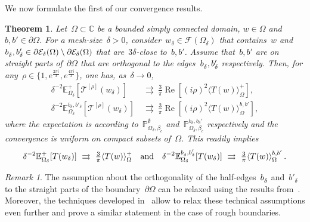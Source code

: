 \documentclass[reqno,11pt,a4paper]{amsart}
\newtheorem{theorem}{Theorem}
\theoremstyle{remark}
\newtheorem{remark}[proposition]{Remark}
\newcommand{\calE}{\mathcal{E}}
\newcommand{\bbP}{\mathbb{P}}
\newcommand{\Edges}{\mathcal{E}}
\newcommand{\Faces}{\mathcal{F}}
\newcommand{\C}{\mathbb{C}}
\newcommand{\dob}{{b,b'}}
\newcommand{\Edelta}{\mathbb{E}_{\Omega_\delta}}
\renewcommand\Re{\operatorname{Re}}
\newcommand\Corr[1]{\langle #1 \rangle}
\newcommand\CorrO[2][+]{\Corr{#2}_\Omega^{#1}}
\begin{document}
We now formulate the first of our convergence results.

\begin{theorem} \label{thm:Ising1}
	Let~$\Omega\subset\C$ be a bounded simply connected domain, $w\in\Omega$ and~$b,b'\in\partial\Omega$.
	For a mesh-size~$\delta>0$, consider~$w_\delta\in\Faces(\Omega_\delta)$ that contains~$w$ and~$b^{\vphantom{\prime}}_\delta,b'_\delta \in\partial\Edges_\delta(\Omega)\setminus \partial\calE_\delta(\Omega)$ that are~$3\delta$-close to~$b,b'$.
	Assume that~$b,b'$ are on straight parts of~$\partial \Omega$ that are orthogonal to the edges~$b^{\vphantom{\prime}}_\delta,b'_\delta$ respectively.
	Then, for any~$\rho\in\{1, e^{\frac{2\pi i}{3} },e^{\frac{4\pi i}{3}}\}$, one has, as~$\delta\to 0$,
\begin{align*}
	\delta^{-2}\Edelta^+[\mathcal{T}^{[\rho]}(w_\delta)]&~\rightrightarrows~\tfrac{3}{\pi}\Re[(i\rho)^2\CorrO{T(w)}], \\
	\delta^{-2}\Edelta^{b_\delta,b'_\delta}[\mathcal{T}^{[\rho]}(w_\delta)]&~\rightrightarrows~\tfrac{3}{\pi}\Re[(i\rho)^2\Corr{T(w)}_\Omega^{b,b'}],
\end{align*}
where the expectation is according to~$\bbP_{\Omega_{\delta},\beta_c}^{\emptyset}$ and~$\bbP_{\Omega_{\delta},\beta_c}^{b_\delta,b_\delta'}$ respectively and the convergence is uniform on compact subsets of~$\Omega$. This readily implies
\[
	\delta^{-2}\Edelta^+[T(w_\delta)]\ \rightrightarrows\ \tfrac{3}{\pi}\CorrO{T(w)}
	\quad\text{and}\quad \delta^{-2}\Edelta^{b^{\vphantom{\prime}}_\delta,b'_\delta}[T(w_\delta)]\ \rightrightarrows\ \tfrac{3}{\pi}\Corr{T(w)}_\Omega^\dob\,.
\]
\end{theorem}

\begin{remark} \label{rem:boundary_thm1}
The assumption about the orthogonality of the half-edges~$b^{\vphantom{\prime}}_\delta$ and~$b'_\delta$ to the straight parts of the boundary~$\partial\Omega$ can be relaxed using the results from~\cite{CheSmi11}.
Moreover, the techniques developed in~\cite{HonKyt13} allow to relax these technical assumptions even further and prove
a similar statement in the case of rough boundaries.
\end{remark}
\end{document}
